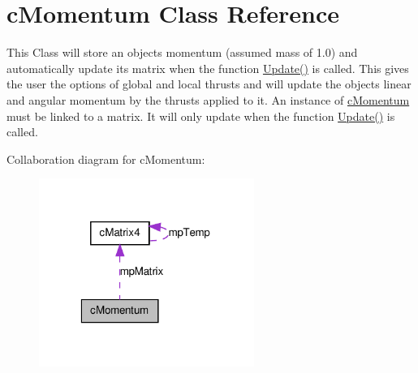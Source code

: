 \hypertarget{classc_momentum}{
\section{cMomentum Class Reference}
\label{classc_momentum}
}


This Class will store an objects momentum (assumed mass of 1.0) and automatically update its matrix when the function \hyperlink{classc_momentum_ae860280e817e7afef71222afd0b12ec8}{Update()} is called. This gives the user the options of global and local thrusts and will update the objects linear and angular momentum by the thrusts applied to it. An instance of \hyperlink{classc_momentum}{cMomentum} must be linked to a matrix. It will only update when the function \hyperlink{classc_momentum_ae860280e817e7afef71222afd0b12ec8}{Update()} is called.  




Collaboration diagram for cMomentum:\nopagebreak
\begin{figure}[H]
\begin{center}
\leavevmode
\includegraphics[width=199pt]{classc_momentum__coll__graph}
\end{center}
\end{figure}
